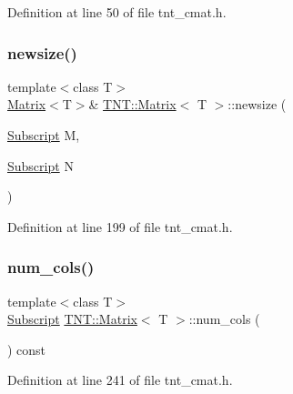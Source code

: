 Definition at line 50 of file tnt\+\_\+cmat.\+h.

\mbox{\label{classTNT_1_1Matrix_a2fa0b7e3924a7a51d2973b93b698aa05}} 
\subsubsection{\texorpdfstring{newsize()}{newsize()}}
{\footnotesize\ttfamily template$<$class T$>$ \\
\hyperlink{classTNT_1_1Matrix}{Matrix}$<$T$>$\& \hyperlink{classTNT_1_1Matrix}{T\+N\+T\+::\+Matrix}$<$ T $>$\+::newsize (\begin{DoxyParamCaption}\item[{\hyperlink{namespaceTNT_af22e3f1460e145c04ce4e7d701e4c1c1}{Subscript}}]{M,  }\item[{\hyperlink{namespaceTNT_af22e3f1460e145c04ce4e7d701e4c1c1}{Subscript}}]{N }\end{DoxyParamCaption})\hspace{0.3cm}{\ttfamily [inline]}}



Definition at line 199 of file tnt\+\_\+cmat.\+h.

\mbox{\label{classTNT_1_1Matrix_ad767dfb493b6b31003a020587ad705ae}} 
\subsubsection{\texorpdfstring{num\+\_\+cols()}{num\_cols()}}
{\footnotesize\ttfamily template$<$class T$>$ \\
\hyperlink{namespaceTNT_af22e3f1460e145c04ce4e7d701e4c1c1}{Subscript} \hyperlink{classTNT_1_1Matrix}{T\+N\+T\+::\+Matrix}$<$ T $>$\+::num\+\_\+cols (\begin{DoxyParamCaption}{ }\end{DoxyParamCaption}) const\hspace{0.3cm}{\ttfamily [inline]}}



Definition at line 241 of file tnt\+\_\+cmat.\+h.

\mbox{\label{classTNT_1_1Matrix_a740bfce0b26b2c47754d85cf89531ab5}} 
